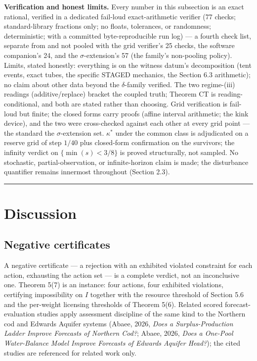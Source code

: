 \documentclass[3p,11pt]{elsarticle}
\begin{document}
\textbf{Verification and honest limits.} Every number in this subsection
is an exact rational, verified in a dedicated fail-loud exact-arithmetic
verifier (77 checks; standard-library fractions only; no floats,
tolerances, or randomness; deterministic; with a committed
byte-reproducible run log) --- a fourth check list, separate from and
not pooled with the grid verifier's 25 checks, the software companion's
24, and the \(\sigma\)-extension's 57 (the family's non-pooling
policy). Limits, stated honestly: everything is on the witness datum's
decomposition (tent events, exact tubes, the specific STAGED mechanics,
the Section 6.3 arithmetic); no claim about other data beyond the
\(\delta\)-family verified. The two regime-(iii) readings
(additive/replace) bracket the coupled truth; Theorem CT is
reading-conditional, and both are stated rather than choosing. Grid
verification is fail-loud but finite; the closed forms carry proofs
(affine interval arithmetic; the kink device), and the two were
cross-checked against each other at every grid point --- the standard
the \(\sigma\)-extension set. \(\kappa^*\) under the common class
is adjudicated on a reserve grid of step \(1/40\) plus closed-form
confirmation on the survivors; the infinity verdict on \(\{\min(s) <
3/8\}\) is proved structurally, not sampled. No stochastic,
partial-observation, or infinite-horizon claim is made; the disturbance
quantifier remains innermost throughout (Section 2.3).

\begin{center}\rule{0.5\linewidth}{0.5pt}\end{center}

\section{Discussion}\label{discussion}

\subsection{Negative certificates}\label{negative-certificates}

A negative certificate --- a rejection with an exhibited violated constraint for each action, exhausting the action set --- is a complete verdict, not an inconclusive one. Theorem 5(7) is an instance: four actions, four exhibited violations, certifying impossibility on \(I\) together with the resource threshold of Section 5.6 and the per-weight licensing thresholds of Theorem 5(6). Related scored forecast-evaluation studies apply assessment discipline of the same kind to the Northern cod and Edwards Aquifer systems (Abaee, 2026, \emph{Does a Surplus-Production Ladder Improve Forecasts of Northern Cod?}; Abaee, 2026, \emph{Does a One-Pool Water-Balance Model Improve Forecasts of Edwards Aquifer Head?}); the cited studies are referenced for related work only.
\end{document}
